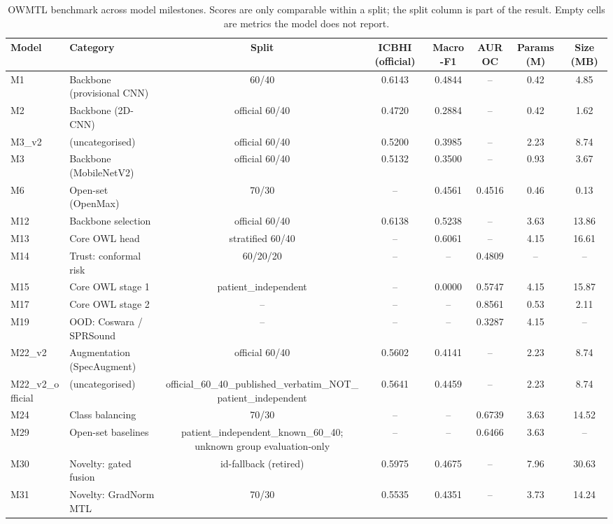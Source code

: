 \begin{table}[htbp]
\centering
\caption{OWMTL benchmark across model milestones. Scores are only comparable within a split; the split column is part of the result. Empty cells are metrics the model does not report.}
\label{tab:main_benchmark}
\begin{tabular}{llcccccc}
\hline
\textbf{Model} & \textbf{Category} & \textbf{Split} & \textbf{ICBHI (official)} & \textbf{Macro-F1} & \textbf{AUROC} & \textbf{Params (M)} & \textbf{Size (MB)} \\
\hline
M1 & Backbone (provisional CNN) & 60/40 & 0.6143 & 0.4844 & -- & 0.42 & 4.85 \\
M2 & Backbone (2D-CNN) & official 60/40 & 0.4720 & 0.2884 & -- & 0.42 & 1.62 \\
M3\_v2 & (uncategorised) & official 60/40 & 0.5200 & 0.3985 & -- & 2.23 & 8.74 \\
M3 & Backbone (MobileNetV2) & official 60/40 & 0.5132 & 0.3500 & -- & 0.93 & 3.67 \\
M6 & Open-set (OpenMax) & 70/30 & -- & 0.4561 & 0.4516 & 0.46 & 0.13 \\
M12 & Backbone selection & official 60/40 & 0.6138 & 0.5238 & -- & 3.63 & 13.86 \\
M13 & Core OWL head & stratified 60/40 & -- & 0.6061 & -- & 4.15 & 16.61 \\
M14 & Trust: conformal risk & 60/20/20 & -- & -- & 0.4809 & -- & -- \\
M15 & Core OWL stage 1 & patient\_independent & -- & 0.0000 & 0.5747 & 4.15 & 15.87 \\
M17 & Core OWL stage 2 & -- & -- & -- & 0.8561 & 0.53 & 2.11 \\
M19 & OOD: Coswara / SPRSound & -- & -- & -- & 0.3287 & 4.15 & -- \\
M22\_v2 & Augmentation (SpecAugment) & official 60/40 & 0.5602 & 0.4141 & -- & 2.23 & 8.74 \\
M22\_v2\_official & (uncategorised) & official\_60\_40\_published\_verbatim\_NOT\_patient\_independent & 0.5641 & 0.4459 & -- & 2.23 & 8.74 \\
M24 & Class balancing & 70/30 & -- & -- & 0.6739 & 3.63 & 14.52 \\
M29 & Open-set baselines & patient\_independent\_known\_60\_40; unknown group evaluation-only & -- & -- & 0.6466 & 3.63 & -- \\
M30 & Novelty: gated fusion & id-fallback (retired) & 0.5975 & 0.4675 & -- & 7.96 & 30.63 \\
M31 & Novelty: GradNorm MTL & 70/30 & 0.5535 & 0.4351 & -- & 3.73 & 14.24 \\

\end{tabular}
\end{table}
